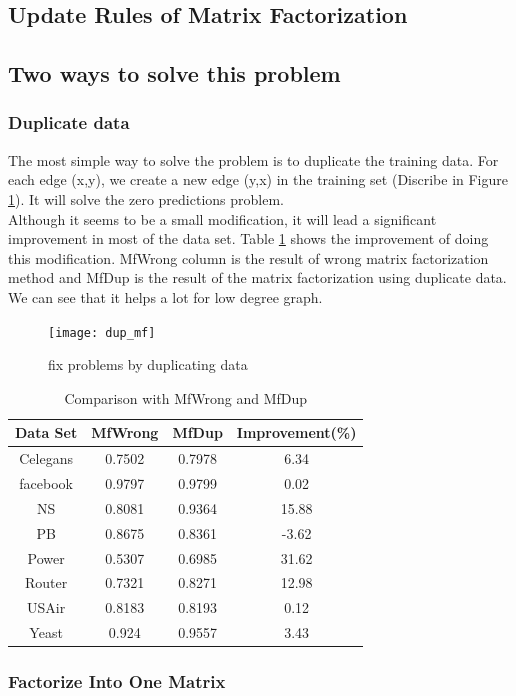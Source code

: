 \documentclass[12pt]{article}
\begin{document}
\subsection {Update Rules of Matrix Factorization}


\subsection{Two ways to solve this problem}

\subsubsection{Duplicate data}
The most simple way to solve the problem is to duplicate the training data. For each edge (x,y), we create a new edge (y,x) in the training set (Discribe in Figure \ref{fig:dup_mf}). It will solve the zero predictions problem. 
\\
Although it seems to be a small modification, it will lead a significant improvement in most of the data set.
Table \ref{tab:dup} shows the improvement of doing this modification. MfWrong column is the result of wrong matrix factorization method and MfDup is the result of the matrix factorization using duplicate data. We can see that it helps a lot for low degree graph. 

\begin{figure}[h]
	\centering
	\texttt{[image: dup\_mf]}
	\caption{fix problems by duplicating data}
	\label{fig:dup_mf}
\end{figure}

\begin{table}
	\begin{center}
		\begin{tabular}{|c|c|c|c|}
			\hline
			Data Set & MfWrong & MfDup & Improvement(\%) \\
			\hline
			Celegans&0.7502&0.7978&6.34\\
			facebook&0.9797&0.9799&0.02\\
			NS&0.8081&0.9364&15.88\\
			PB&0.8675&0.8361&-3.62\\
			Power&0.5307&0.6985&31.62\\
			Router&0.7321&0.8271&12.98\\
			USAir&0.8183&0.8193&0.12\\
			Yeast&0.924&0.9557&3.43\\
			\hline
		\end{tabular}
	\end{center}
	\caption{Comparison with MfWrong and MfDup}
	\label{tab:dup}
\end{table}

\subsubsection{Factorize Into One Matrix}



	
\end{document}
